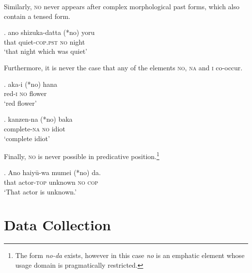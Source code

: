 \documentclass [output=book,colorlinks,citecolor=brown]{langscibook}
\begin{document}
Similarly, \textsc{no} never appears after complex morphological past forms, which also contain a tensed form.

\exg. ano shizuka-datta (*no) yoru\\
that quiet-\textsc{cop.pst} \textsc{no} night\\
`that night which was quiet’

Furthermore, it is never the case that any of the elements \textsc{no}, \textsc{na} and \textsc{i} co-occur.

\exg. aka-i (*no) hana\\
red-\textsc{i} \textsc{no} flower\\
`red flower'

\exg. kanzen-na (*no) baka\\
complete-\textsc{na} \textsc{no} idiot\\
`complete idiot'

Finally, \textsc{no} is never possible in predicative position.\footnote{The form \textit{no-da} exists, however in this case \textit{no} is an emphatic element whose usage domain is pragmatically restricted.}

\exg. Ano haiyū-wa mumei (*no) da.\\
that actor-\textsc{top} unknown \textsc{no} \textsc{cop}\\
`That actor is unknown.’


\section{Data Collection} \label{corpusanalysis}
\end{document}

